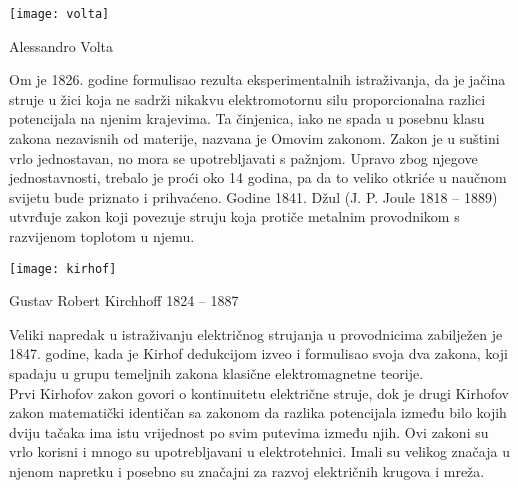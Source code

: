 	\begin{marginfigure}%
		\texttt{[image: volta]}
		\caption{Alessandro Volta}
		\label{fig:volta}
	\end{marginfigure} 

	Om je 1826. godine formulisao rezulta eksperimentalnih istraživanja, da je jačina struje u žici koja ne sadrži nikakvu elektromotornu silu proporcionalna razlici potencijala na njenim krajevima. Ta činjenica, iako ne spada u posebnu klasu zakona nezavisnih od materije, nazvana je Omovim zakonom. Zakon je u suštini vrlo jednostavan, no mora se upotrebljavati s pažnjom. Upravo zbog njegove jednostavnosti, trebalo je proći oko 14 godina, pa da to veliko otkriće u naučnom svijetu bude priznato i prihvaćeno. Godine 1841. Džul (J. P. Joule 1818 – 1889) utvrđuje zakon koji povezuje struju koja protiče metalnim provodnikom s razvijenom toplotom u njemu.\\
	
	
	\begin{marginfigure}%
		\texttt{[image: kirhof]}
		\caption{Gustav Robert Kirchhoff 1824 – 1887}
		\label{fig:kirhof}
	\end{marginfigure} 
	
	Veliki napredak u istraživanju električnog strujanja u provodnicima zabilježen je 1847. godine, kada je Kirhof dedukcijom izveo i formulisao svoja dva zakona, koji spadaju u grupu temeljnih zakona klasične elektromagnetne teorije. \\
	Prvi Kirhofov zakon govori o  kontinuitetu električne struje, dok je drugi Kirhofov zakon matematički identičan sa zakonom da razlika potencijala između bilo kojih dviju tačaka ima istu vrijednost po svim putevima između njih. Ovi zakoni su vrlo korisni i mnogo su upotrebljavani u elektrotehnici. Imali su velikog značaja u njenom napretku i posebno su značajni za razvoj električnih krugova i mreža.